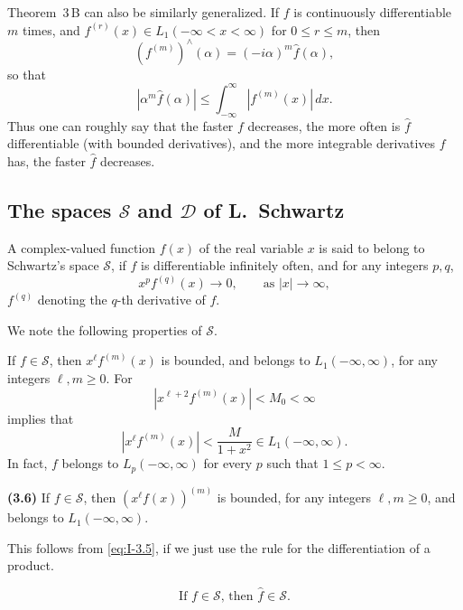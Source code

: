 Theorem~3\,B can also be similarly generalized. If $f$ is continuously differentiable $m$ times, and $f^{(r)}(x)\in L_1(-\infty<x<\infty)$ for $0\le r\le m$, then
\begin{equation}\label{eq:I-3.mB}
(f^{(m)})^{\wedge}(\alpha)=(-i\alpha)^m\hat f(\alpha),
\end{equation}
so that
\begin{equation*}
|\alpha^m\widehat f(\alpha)|\le\int_{-\infty}^{\infty}|f^{(m)}(x)|\,dx.
\end{equation*}
Thus one can roughly say that the faster $f$ decreases, the more often is $\hat f$ differentiable (with bounded derivatives), and the more integrable derivatives $f$ has, the faster $\hat f$ decreases.

\subsection*{The spaces $\mathcal S$ and $\mathcal D$ of L.~Schwartz}
A complex-valued function $f(x)$ of the real variable $x$ is said to belong to Schwartz's space $\mathcal S$, if $f$ is differentiable infinitely often, and for any integers $p,q$,
\begin{equation*}
x^p f^{(q)}(x)\to 0,\qquad\text{as }|x|\to\infty,
\end{equation*}
$f^{(q)}$ denoting the $q$-th derivative of $f$.

We note the following properties of $\mathcal S$.

\noindent{} If $f\in\mathcal S$, then $x^\ell f^{(m)}(x)$ is bounded, and belongs to $L_1(-\infty,\infty)$, for any integers $\ell,m\ge 0$. For
\begin{equation*}
|x^{\ell+2}f^{(m)}(x)|<M_0<\infty
\end{equation*}
implies that
\begin{equation*}
|x^\ell f^{(m)}(x)|<\frac{M}{1+x^2}\in L_1(-\infty,\infty).
\end{equation*}
In fact, $f$ belongs to $L_p(-\infty,\infty)$ for every $p$ such that $1\le p<\infty$.

\noindent\textbf{(3.6)} If $f\in\mathcal S$, then $(x^\ell f(x))^{(m)}$ is bounded, for any integers $\ell,m\ge 0$, and belongs to $L_1(-\infty,\infty)$.

This follows from \eqref{eq:I-3.5}, if we just use the rule for the differentiation of a product.

\begin{equation*}\tag{3.7}\label{eq:I-3.7}\text{If $f\in\mathcal S$, then $\hat f\in\mathcal S$.}\end{equation*}

